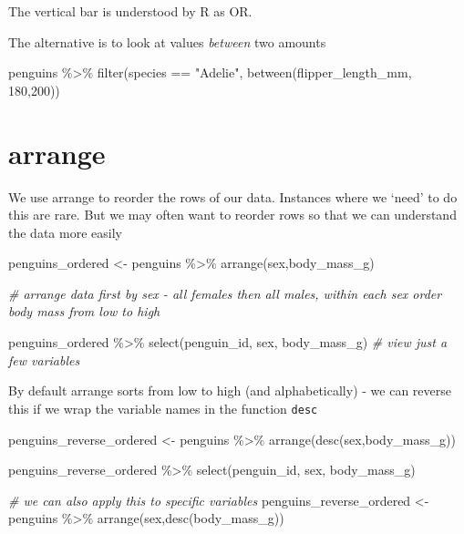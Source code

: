 \documentclass[
]{book}
\newenvironment{Shaded}{\begin{snugshade}}{\end{snugshade}}
\newcommand{\CommentTok}[1]{\textcolor[rgb]{0.56,0.35,0.01}{\textit{#1}}}
\newcommand{\DecValTok}[1]{\textcolor[rgb]{0.00,0.00,0.81}{#1}}
\newcommand{\FunctionTok}[1]{\textcolor[rgb]{0.00,0.00,0.00}{#1}}
\newcommand{\NormalTok}[1]{#1}
\newcommand{\OtherTok}[1]{\textcolor[rgb]{0.56,0.35,0.01}{#1}}
\newcommand{\SpecialCharTok}[1]{\textcolor[rgb]{0.00,0.00,0.00}{#1}}
\newcommand{\StringTok}[1]{\textcolor[rgb]{0.31,0.60,0.02}{#1}}
\begin{document}
The vertical bar \textbar{} is understood by R as OR.

The alternative is to look at values \emph{between} two amounts

\begin{Shaded}
\begin{Highlighting}[]
\NormalTok{penguins }\SpecialCharTok{\%\textgreater{}\%} 
  \FunctionTok{filter}\NormalTok{(species }\SpecialCharTok{==} \StringTok{"Adelie"}\NormalTok{,}
         \FunctionTok{between}\NormalTok{(flipper\_length\_mm, }\DecValTok{180}\NormalTok{,}\DecValTok{200}\NormalTok{))}
\end{Highlighting}
\end{Shaded}

\hypertarget{arrange}{%
\section{arrange}\label{arrange}}

We use arrange to reorder the rows of our data. Instances where we `need' to do this are rare. But we may often want to reorder rows so that we can understand the data more easily

\begin{Shaded}
\begin{Highlighting}[]
\NormalTok{penguins\_ordered }\OtherTok{\textless{}{-}}\NormalTok{ penguins }\SpecialCharTok{\%\textgreater{}\%} 
  \FunctionTok{arrange}\NormalTok{(sex,body\_mass\_g)}

\CommentTok{\# arrange data first by sex {-} all females then all males, within each sex order body mass from low to high}
  
\NormalTok{penguins\_ordered }\SpecialCharTok{\%\textgreater{}\%} 
  \FunctionTok{select}\NormalTok{(penguin\_id, sex, body\_mass\_g)}
\CommentTok{\# view just a few variables}
\end{Highlighting}
\end{Shaded}

By default arrange sorts from low to high (and alphabetically) - we can reverse this if we wrap the variable names in the function \texttt{desc}

\begin{Shaded}
\begin{Highlighting}[]
\NormalTok{penguins\_reverse\_ordered }\OtherTok{\textless{}{-}}\NormalTok{ penguins }\SpecialCharTok{\%\textgreater{}\%} 
  \FunctionTok{arrange}\NormalTok{(}\FunctionTok{desc}\NormalTok{(sex,body\_mass\_g))}


  
\NormalTok{penguins\_reverse\_ordered }\SpecialCharTok{\%\textgreater{}\%} 
  \FunctionTok{select}\NormalTok{(penguin\_id, sex, body\_mass\_g)}


\CommentTok{\# we can also apply this to specific variables}
\NormalTok{penguins\_reverse\_ordered }\OtherTok{\textless{}{-}}\NormalTok{ penguins }\SpecialCharTok{\%\textgreater{}\%} 
  \FunctionTok{arrange}\NormalTok{(sex,}\FunctionTok{desc}\NormalTok{(body\_mass\_g))}
\end{Highlighting}
\end{Shaded}
\end{document}
